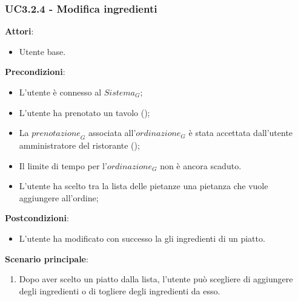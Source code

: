 \subsubsection{UC3.2.4 - Modifica ingredienti
}\label{usecase:3_2_4}
\textbf{Attori}:
\begin{itemize}
    \item Utente base.
\end{itemize}
\textbf{Precondizioni}:
\begin{itemize}
    \item L'utente è connesso al $\textit{Sistema}_G$; 
    \item L'utente ha prenotato un tavolo ();
    \item La $\textit{prenotazione}_G$ associata all'$\textit{ordinazione}_G$ è stata accettata dall'utente amministratore del ristorante ();
    \item Il limite di tempo per l'$\textit{ordinazione}_G$ non è ancora scaduto.
    \item L'utente ha scelto tra la lista delle pietanze una pietanza che vuole aggiungere all'ordine;
\end{itemize}
\textbf{Postcondizioni}:
\begin{itemize}
    \item L'utente ha modificato con successo la gli ingredienti di un piatto.
\end{itemize}
\textbf{Scenario principale}:
\begin{enumerate}
    \item Dopo aver scelto un piatto dalla lista, l'utente può scegliere di aggiungere degli ingredienti o di togliere degli ingredienti da esso.
\end{enumerate}

\newpage

